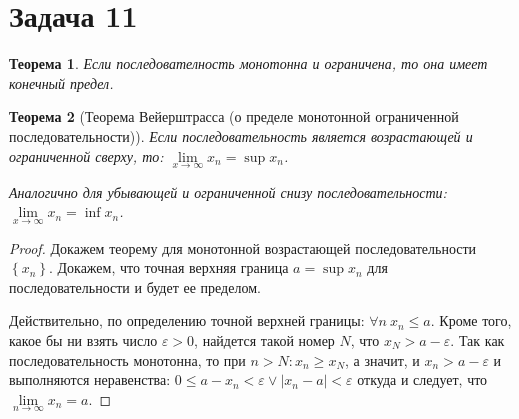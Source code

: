 \documentclass[a4paper,12pt]{article}
\newtheorem*{ther}{Теорема}
\newcommand{\eps}{\varepsilon}
\begin{document}
    \section*{Задача 11}

    \begin{ther}
        Если последователность монотонна и ограничена, то она имеет конечный предел.
    \end{ther}

    \begin{ther}[Теорема Вейерштрасса (о пределе монотонной ограниченной последовательности)]

        Если последовательность является возрастающей и ограниченной сверху, то: $\lim\limits_{x \to \infty} x_n = \sup {x_n}$.

        Аналогично для убывающей и ограниченной снизу последовательности: $\lim\limits_{x \to \infty} x_n = \inf {x_n}$.
    \end{ther}

    \begin{proof}
        Докажем теорему для монотонной возрастающей последовательности $\left\{x_n\right\}$. Докажем, что точная верхняя граница $a = \sup{x_n}$ для последовательности и будет ее пределом.

        Действительно, по определению точной верхней границы: 
        $\forall n\ x_n \leq a$.
        Кроме того, какое бы ни взять число $\eps > 0$, найдется такой номер $N$, что $x_N > a - \eps$.
        Так как последовательность монотонна, то при $n > N: x_n \geq x_N$, а значит, и $x_n > a - \eps$ и выполняются неравенства: $0 \leq a - x_n < \eps \vee \left | x_n - a \right | <\eps$
         откуда и следует, что $\lim\limits_{n \to \infty} x_n = a$.
    \end{proof}
\end{document}

